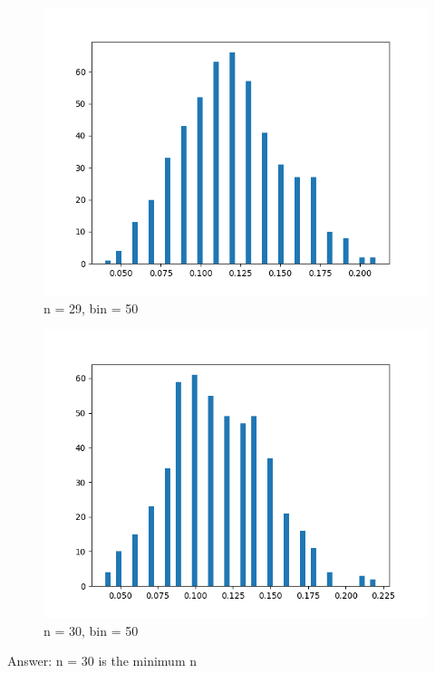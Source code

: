 \documentclass[answers]{exam}
\begin{document}
\begin{framed}
\begin{figure}[H] %
    \centering
    \includegraphics[width= 0.5 \textwidth]{Q5.3_n=29.png}
    \caption{n = 29, bin = 50}
\end{figure}

\begin{figure}[H] %
    \centering
    \includegraphics[width= 0.5 \textwidth]{Q5.3_n=30.png}
    \caption{n = 30, bin = 50}
\end{figure}

Answer: n = 30 is the minimum n 


\end{framed}
\end{document}

